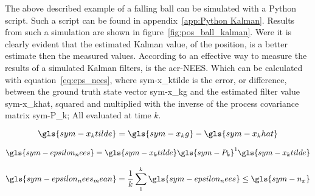 The above described example of a falling ball can be simulated with a Python script. Such a script can be found in
appendix~\ref{app:Python Kalman}. Results from such a simulation are shown in figure~\ref{fig:pos_ball_kalman}. Were it
is clearly evident that the estimated Kalman value, of the position, is a better estimate then the measured values.
According to \citet{roger_r_labbe_jr_kalman_2017} an effective way to measure the results of a simulated Kalman filters,
is the \gls{acr-NEES}. Which can be calculated with equation~\ref{eq:eps_nees}, where \gls{sym-x_ktilde} is the
error, or difference, between the ground truth state vector \gls{sym-x_kg} and the estimated filter value
\gls{sym-x_khat}, squared and multiplied with the inverse of the process covariance matrix \gls{sym-P_k}; All evaluated
at time \( k \).

\begin{equation}
    \label{eq:xtild}
    \gls{sym-x_ktilde} = \gls{sym-x_kg} - \gls{sym-x_khat}
\end{equation}

\begin{equation}
    \label{eq:eps_nees}
    \gls{sym-epsilon_nees} = \gls{sym-x_ktilde} \gls{sym-P_k}^1 \gls{sym-x_ktilde}
\end{equation}

\begin{equation}
    \label{eq:mean_eps}
    \gls{sym-epsilon_nees_mean} = \frac{1}{k}\sum_{1}^{k} \gls{sym-epsilon_nees} \leq \gls{sym-n_x}
\end{equation}

